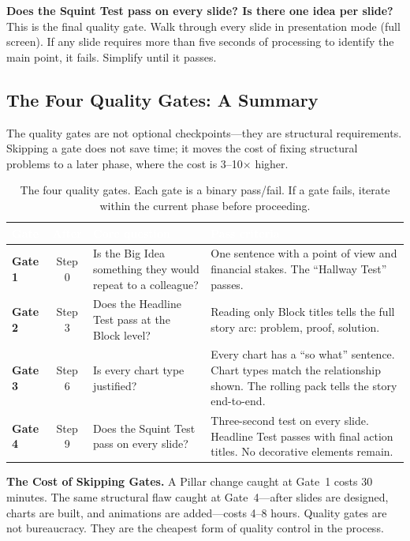 \begin{insightbox}
\textbf{Does the Squint Test pass on every slide? Is there one idea per slide?} This is the final quality gate. Walk through every slide in presentation mode (full screen). If any slide requires more than five seconds of processing to identify the main point, it fails. Simplify until it passes.
\end{insightbox}

\subsection{The Four Quality Gates: A Summary}
The quality gates are not optional checkpoints---they are structural requirements. Skipping a gate does not save time; it moves the cost of fixing structural problems to a later phase, where the cost is 3--10$\times$ higher.

\begin{table}[H]
\centering
\small
{}
\begin{tabularx}{\textwidth}{>{\bfseries\color{heading}}l c X X}
\toprule
\rowcolor{tableheader}
\textcolor{white}{\textbf{Gate}} & \textcolor{white}{\textbf{After}} & \textcolor{white}{\textbf{Core question}} & \textcolor{white}{\textbf{Pass criteria}} \\
\midrule
Gate 1 & Step 0 & Is the Big Idea something they would repeat to a colleague? & One sentence with a point of view and financial stakes. The ``Hallway Test'' passes. \\
Gate 2 & Step 3 & Does the Headline Test pass at the Block level? & Reading only Block titles tells the full story arc: problem, proof, solution. \\
Gate 3 & Step 6 & Is every chart type justified? & Every chart has a ``so what'' sentence. Chart types match the relationship shown. The rolling pack tells the story end-to-end. \\
Gate 4 & Step 9 & Does the Squint Test pass on every slide? & Three-second test on every slide. Headline Test passes with final action titles. No decorative elements remain. \\
\bottomrule
\end{tabularx}
\caption{The four quality gates. Each gate is a binary pass/fail. If a gate fails, iterate within the current phase before proceeding.}
\label{tab:four-gates}
\end{table}

\begin{diagnosisbox}
\textbf{The Cost of Skipping Gates.} A Pillar change caught at Gate~1 costs 30 minutes. The same structural flaw caught at Gate~4---after slides are designed, charts are built, and animations are added---costs 4--8 hours. Quality gates are not bureaucracy. They are the cheapest form of quality control in the process.
\end{diagnosisbox}

\clearpage

